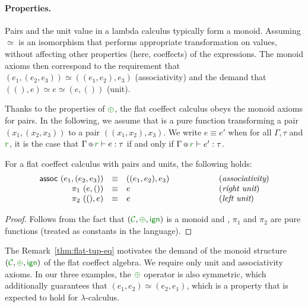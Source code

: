 \paragraph{Properties.}
Pairs and the unit value in a lambda calculus typically form a monoid. Assuming $\simeq$ is an
isomorphism that performs appropriate transformation on values, without affecting other
properties (here, coeffects) of the expressions. The monoid axioms then correspond to
the requirement that $(e_1, (e_2, e_3)) \simeq ((e_1, e_2), e_3)$ (associativity) and the
demand that $((), e) \simeq e \simeq (e, ())$ (unit).

Thanks to the properties of $\cpar$, the flat coeffect calculus obeys the monoid axioms for pairs.
In the following, we assume that  is a pure function transforming a pair $(x_1, (x_2, x_3))$
to a pair $((x_1, x_2), x_3)$. We write $e \equiv e'$ when for all $\Gamma, \tau$ and $\cclrd{r}$,
it is the case that $\coctx{\Gamma}{\cclrd{r}} \vdash e : \tau$ if and only if
$\coctx{\Gamma}{\cclrd{r}} \vdash e' : \tau$.

\begin{remark}
\label{thm:flat-tup-eq}
For a flat coeffect calculus with pairs and units, the following holds:
%
\begin{equation*}
\begin{array}{rclcl}
 \textnormal{\sffamily assoc}~(e_1, (e_2, e_3)) &\equiv& ((e_1, e_2), e_3) &\qquad\qquad&(\emph{associativity}) \\
 \pi_1~(e, ()) &\equiv& e &&(\emph{right unit})\\
 \pi_2~((), e) &\equiv& e &&(\emph{left unit})\\
\end{array}
\end{equation*}
\end{remark}
\begin{proof}
Follows from the fact that $(\C, \cpar, \czero)$ is a monoid and , $\pi_1$ and
$\pi_2$ are pure functions (treated as constants in the language).
\end{proof}

\noindent
The Remark~\ref{thm:flat-tup-eq} motivates the demand of the monoid structure
$(\C, \cpar, \czero)$ of the flat coeffect algebra. We require only unit and associativity
axioms. In our three examples, the $\cpar$ operator is also symmetric, which additionally
guarantees that $(e_1, e_2) \simeq (e_2, e_1)$, which is a property that is expected to hold
for $\lambda$-calculus.



